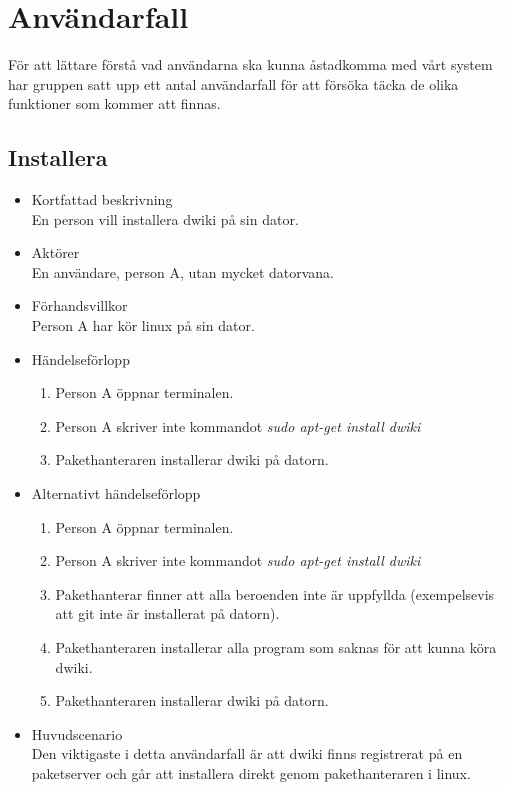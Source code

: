 \section{Användarfall} 

För att lättare förstå vad användarna ska kunna åstadkomma med vårt system har gruppen satt upp ett antal användarfall för att försöka täcka de olika funktioner som kommer att finnas.

\subsection{Installera}

\begin{itemize}
	\item Kortfattad beskrivning
	\\En person vill installera dwiki på sin dator.
	\item Aktörer
	\\En användare, person A, utan mycket datorvana.
	\item Förhandsvillkor
	\\Person A har kör linux på sin dator.
	\item Händelseförlopp
	\begin{enumerate}
		\item Person A öppnar terminalen.
		\item Person A skriver inte kommandot \textit{sudo apt-get install dwiki}
		\item Pakethanteraren installerar dwiki på datorn.
	\end{enumerate}
	\item Alternativt händelseförlopp
	\begin{enumerate}
		\item Person A öppnar terminalen.
		\item Person A skriver inte kommandot \textit{sudo apt-get install dwiki}
		\item Pakethanterar finner att alla beroenden inte är uppfyllda (exempelsevis att git inte är installerat på datorn).
		\item Pakethanteraren installerar alla program som saknas för att kunna köra dwiki.
		\item Pakethanteraren installerar dwiki på datorn.
	\end{enumerate}	
	\item Huvudscenario
	\\Den viktigaste i detta användarfall är att dwiki finns registrerat på en paketserver och går att installera direkt genom pakethanteraren i linux.

\end{itemize}
